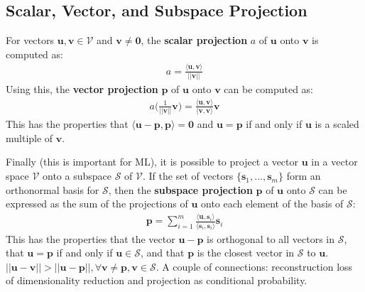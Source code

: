 \documentclass{harvardml}
\theoremstyle{definition}
\theoremstyle{plain}
\renewcommand{\v}[1]{\mathbf{#1}}
\begin{document}
    \subsection{Scalar, Vector, and Subspace Projection}
        For vectors $\v u, \v v \in \mathcal{V}$ and $\v v \neq \v 0$, the 
        \textbf{scalar projection} $a$ of $\v u$ onto $\v v$ is computed as:
            \begin{align*}
                a = \frac{\langle \v u, \v v \rangle}{||\v v||}
            \end{align*}
        \noindent Using this, the \textbf{vector projection} 
		$\v p$ of $\v u$ onto $\v v$ can be computed as:
            \begin{align*}
                a\big(\frac{1}{||\v v||}\v v\big) = 
                \frac{\langle \v u, \v v \rangle}
				{\langle \v v, \v v \rangle} \v v
            \end{align*}
        \noindent This has the properties that $\langle \v u - \v p,
		\v p \rangle = \v 0$ and $\v u = \v p$ if and only if $\v u$ 
		is a scaled multiple of $\v v$.

        \noindent Finally (this is important for ML), it is possible
        to project a vector $\v u$ in a vector space $\mathcal{V}$ onto a
        subspace  $\mathcal{S}$ of $\mathcal{V}$. If the set of vectors
        $\{\v s_1,...,\v s_m\}$ form an orthonormal basis for $\mathcal{S}$,
        then the \textbf{subspace projection} $\v p$ of $\v u$ onto 
		$\mathcal{S}$ can be expressed as the sum of the projections of 
		$\v u$ onto each element of the basis of $\mathcal{S}$:
            \begin{align*}
                \v p = \sum_{i=1}^m 
				\frac{\langle \v u, \v s_i \rangle}
                {\langle \v s_i, \v s_i \rangle} \v s_i
            \end{align*}
        \noindent This has the properties that the vector 
		$\v u - \v p$ is orthogonal to all vectors in $\mathcal{S}$, 
		that $\v u = \v p$ if and only if $\v u \in \mathcal{S}$, and 
		that $\v p$ is the closest vector in $\mathcal{S}$ to $\v u$.
        $|| \v u - \v v || > || \v u - \v p ||, \forall \v v \neq \v p, 
		\v v \in \mathcal{S}$. A couple of connections: reconstruction 
		loss of dimensionality reduction and projection as conditional 
		probability.
\end{document}
